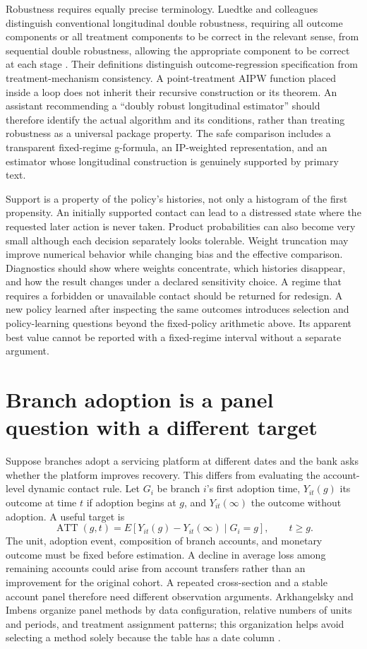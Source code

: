 Robustness requires equally precise terminology. Luedtke and colleagues
distinguish conventional longitudinal double robustness, requiring all outcome
components or all treatment components to be correct in the relevant sense,
from sequential double robustness, allowing the appropriate component to be
correct at each stage \citep{sequentialdr2018}. Their definitions distinguish
outcome-regression specification from treatment-mechanism consistency. A
point-treatment AIPW function placed inside a loop does not inherit their
recursive construction or its theorem. An assistant recommending a
``doubly robust longitudinal estimator'' should therefore identify the actual
algorithm and its conditions, rather than treating robustness as a universal
package property. The safe comparison includes a transparent fixed-regime
g-formula, an IP-weighted representation, and an estimator whose longitudinal
construction is genuinely supported by primary text.

Support is a property of the policy's histories, not only a histogram of the
first propensity. An initially supported contact can lead to a distressed
state where the requested later action is never taken. Product probabilities
can also become very small although each decision separately looks tolerable.
Weight truncation may improve numerical behavior while changing bias and the
effective comparison. Diagnostics should show where weights concentrate,
which histories disappear, and how the result changes under a declared
sensitivity choice. A regime that requires a forbidden or unavailable contact
should be returned for redesign. A new policy learned after inspecting the
same outcomes introduces selection and policy-learning questions beyond the
fixed-policy arithmetic above. Its apparent best value cannot be reported
with a fixed-regime interval without a separate argument.

\section{Branch adoption is a panel question with a different target}
\label{exec14:l5-panel}

Suppose branches adopt a servicing platform at different dates and the bank
asks whether the platform improves recovery. This differs from evaluating the
account-level dynamic contact rule. Let $G_i$ be branch $i$'s first adoption
time, $Y_{it}(g)$ its outcome at time $t$ if adoption begins at $g$, and
$Y_{it}(\infty)$ the outcome without adoption. A useful target is
\[
 \operatorname{ATT}(g,t)
 =E[Y_{it}(g)-Y_{it}(\infty)\mid G_i=g],\qquad t\geq g.
\]
The unit, adoption event, composition of branch accounts, and monetary outcome
must be fixed before estimation. A decline in average loss among remaining
accounts could arise from account transfers rather than an improvement for
the original cohort. A repeated cross-section and a stable account panel
therefore need different observation arguments. Arkhangelsky and Imbens
organize panel methods by data configuration, relative numbers of units and
periods, and treatment assignment patterns; this organization helps avoid
selecting a method solely because the table has a date column
\citep{panelreview2024}.

